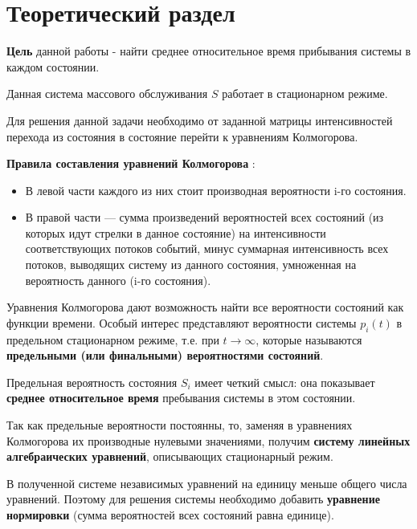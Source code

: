 \chapter{Теоретический раздел}

\textbf{Цель} данной работы - найти среднее относительное время прибывания системы в каждом состоянии.

Данная система массового обслуживания \cite{mathhelpplanet-smo} $S$ работает в стационарном режиме.

Для решения данной задачи необходимо от заданной матрицы интенсивностей перехода из состояния в состояние перейти к уравнениям Колмогорова.

\textbf{Правила составления уравнений Колмогорова} \cite{mathhelpplanet-kolmogorov}:
\begin{itemize}
	\item В левой части каждого из них стоит производная вероятности i-го состояния.
	\item В правой части — сумма произведений вероятностей всех состояний (из которых идут стрелки в данное состояние) на интенсивности соответствующих потоков событий, минус суммарная интенсивность всех потоков, выводящих систему из данного состояния, умноженная на вероятность данного (i-го состояния).
\end{itemize}

Уравнения Колмогорова дают возможность найти все вероятности состояний как функции времени. Особый интерес представляют вероятности системы $p_i(t)$ в предельном стационарном режиме, т.е. при $t \to \infty $, которые называются \textbf{предельными (или финальными) вероятностями состояний}.

Предельная вероятность состояния $S_i$ имеет четкий смысл: она показывает \textbf{среднее относительное время} пребывания системы в этом состоянии.

Так как предельные вероятности постоянны, то, заменяя в уравнениях Колмогорова их производные нулевыми значениями, получим \textbf{систему линейных алгебраических уравнений}, описывающих стационарный режим.

В полученной системе независимых уравнений на единицу меньше общего числа уравнений. Поэтому для решения системы необходимо добавить \textbf{уравнение нормировки} (сумма вероятностей всех состояний равна единице).



